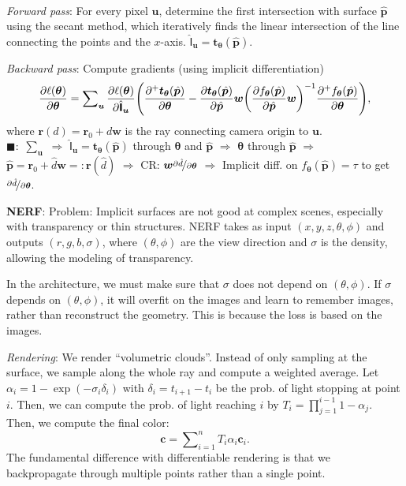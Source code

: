 \documentclass{article}
\newcommand{\lft}{\mathopen{}\mathclose\bgroup\left}
\newcommand{\rgt}{\aftergroup\egroup\right}
\renewcommand{\vec}[1]{\bm{#1}}
\newcommand{\tens}[1]{\bm{\mathsf{#1}}}
\newenvironment{topic}[1]
{\textbf{\sffamily \colorbox{black}{\rlap{\textbf{\textcolor{white}{#1}}}\hspace{\linewidth}\hspace{-2\fboxsep}}} \\ \vspace{0.2cm}}
{}
\begin{document}
\begin{multicols*}{2}
\begin{topic}{Implicit surfaces and neural radiance fields}
        \textit{Forward pass}: For every pixel $\vec{u}$, determine the first intersection with surface
        $\hat{\vec{p}}$ using the secant method, which iteratively finds the linear intersection of the
        line connecting the points and the $x$-axis. $\hat{\tens{I}}_{\vec{u}} =
            \vec{t}_{\vec{\theta}}(\hat{\vec{p}})$.

        \textit{Backward pass}: Compute gradients (using implicit differentiation) \[
            \pdv{\ell(\vec{\theta})}{\vec{\theta}} = \sum\nolimits_{\vec{u}} \pdv{\ell(\vec{\theta})}{\hat{\tens{I}}_{\vec{u}}} \lft( \pdv{^+ \vec{t}_{\vec{\theta}}(\hat{\vec{p}})}{\vec{\theta}} - \pdv{\vec{t}_{\vec{\theta}}(\hat{\vec{p}})}{\hat{\vec{p}}} \vec{w} \lft( \pdv{f_{\vec{\theta}}(\hat{\vec{p}})}{\hat{\vec{p}}} \vec{w} \rgt)^{-1} \pdv{^+ f_{\vec{\theta}}(\hat{\vec{p}})}{\vec{\theta}} \rgt),
        \]
        where $\vec{r}(d) = \vec{r}_0 + d \vec{w}$ is the ray connecting camera origin to $\vec{u}$.\\
        $\blacksquare:$ $\sum_{\vec{u}}$ $\Rightarrow$ $\hat{\tens{I}}_{\vec{u}} =
            \vec{t}_{\vec{\theta}}(\hat{\vec{p}})$ through $\vec{\theta}$ and $\hat{\vec{p}}$ $\Rightarrow$
        $\vec{\theta}$ through $\hat{\vec{p}}$ $\Rightarrow$ $\hat{\vec{p}} = \vec{r}_0 + \hat{d}\vec{w} =:
            \vec{r}(\hat{d})$ $\Rightarrow$ CR: $\vec{w} \nicefrac{\partial \hat{d}}{\partial \vec{\theta}}$
        $\Rightarrow$ Implicit diff. on $f_{\vec{\theta}}(\hat{\vec{p}}) = \tau$ to get $\nicefrac{\partial
                \hat{d}}{\partial \vec{\theta}}$.

        \textbf{NERF}: Problem: Implicit surfaces are not good at complex scenes, especially with
        transparency or thin structures. NERF takes as input $(x,y,z,\theta,\phi)$ and outputs
        $(r,g,b,\sigma)$, where $(\theta,\phi)$ are the view direction and $\sigma$ is the density,
        allowing the modeling of transparency.

        In the architecture, we must make sure that $\sigma$ does not depend on $(\theta,\phi)$. If
        $\sigma$ depends on $(\theta,\phi)$, it will overfit on the images and learn to remember images,
        rather than reconstruct the geometry. This is because the loss is based on the images.

        \textit{Rendering}: We render ``volumetric clouds''. Instead of only sampling at the surface, we sample
        along the whole ray and compute a weighted average. Let $\alpha_i = 1 - \exp(-\sigma_i \delta_i)$
        with $\delta_i = t_{i+1} - t_i$ be the prob. of light stopping at point $i$. Then, we can compute
        the prob. of light reaching $i$ by $T_i = \prod_{j=1}^{i-1} 1 - \alpha_j$. Then, we compute
        the final color: \[
            \vec{c} = \sum\nolimits_{i=1}^{n} T_i \alpha_i \vec{c}_i.
        \]
        The fundamental difference with differentiable rendering is that we backpropagate through multiple
        points rather than a single point.


\end{topic}
\end{multicols*}
\end{document}
